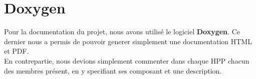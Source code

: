     \section{Doxygen}
        Pour la documentation du projet, nous avons utilisé le logiciel \textbf{Doxygen}. Ce dernier nous a permis de pouvoir generer simplement une documentation HTML et PDF. \\
        En contrepartie, nous devions simplement commenter dans chaque HPP chacun des membres présent, en y specifiant ses composant et une description.
